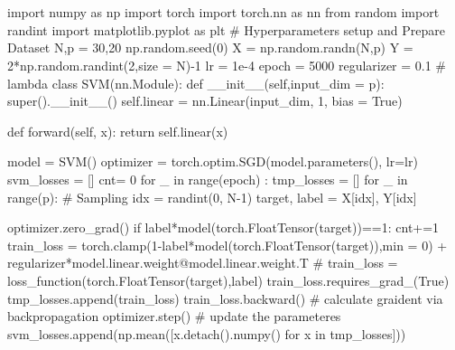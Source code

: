 \documentclass[10pt]{article}
\begin{document}
\section{}
\begin{python}
import numpy as np
import torch
import torch.nn as nn
from random import randint
import matplotlib.pyplot as plt
# Hyperparameters setup and Prepare Dataset
N,p = 30,20
np.random.seed(0)
X = np.random.randn(N,p)
Y = 2*np.random.randint(2,size = N)-1
lr = 1e-4
epoch = 5000
regularizer = 0.1 # lambda
class SVM(nn.Module):
    def __init__(self,input_dim = p):
        super().__init__()
        self.linear = nn.Linear(input_dim, 1, bias = True)
    
    def forward(self, x):
        return self.linear(x)

model = SVM()
optimizer = torch.optim.SGD(model.parameters(), lr=lr) 
svm_losses = []
cnt= 0
for _ in range(epoch) :
    tmp_losses = []
    for _ in range(p):
        # Sampling
        idx = randint(0, N-1)
        target, label = X[idx], Y[idx]
        
        optimizer.zero_grad()
        if label*model(torch.FloatTensor(target))==1:
            cnt+=1
        train_loss = torch.clamp(1-label*model(torch.FloatTensor(target)),min = 0) + regularizer*model.linear.weight@model.linear.weight.T
        # train_loss = loss_function(torch.FloatTensor(target),label)
        train_loss.requires_grad_(True)
        tmp_losses.append(train_loss)
        train_loss.backward() # calculate graident via backpropagation
        optimizer.step() # update the parameteres
    svm_losses.append(np.mean([x.detach().numpy() for x in tmp_losses]))
\end{python}
\end{document}
